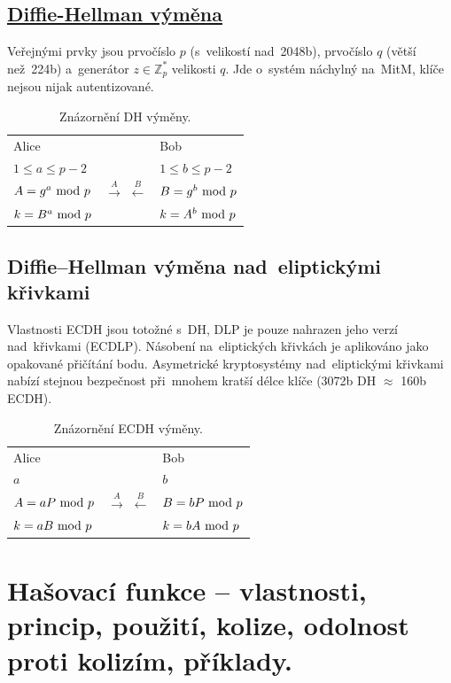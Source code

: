 \subsection[Diffie--Hellman výměna]{\href{https://en.wikipedia.org/wiki/Diffie-Hellman_key_exchange}{Diffie-Hellman výměna}}

Veřejnými prvky jsou prvočíslo $p$ (s~velikostí nad~2048b), prvočíslo $q$ (větší než~224b) a~generátor $z \in \mathbb{Z}_p^*$ velikosti $q$. Jde o~systém náchylný na~MitM, klíče nejsou nijak autentizované.

\begin{table}[ht]
\centering
\begin{tabular}{lcl}
Alice && Bob \\
$1 \le a \le p-2$ && $1 \le b \le p-2$ \\
$A = g^a \ \mathrm{mod}\ p$ & $\stackrel{A}{\rightarrow}$ $\stackrel{B}{\leftarrow}$ & $B = g^b \ \mathrm{mod}\ p$ \\
$k = B^a \ \mathrm{mod}\ p$ && $k = A^b \ \mathrm{mod}\ p$ \\
\end{tabular}
\caption*{Znázornění DH výměny.}
\end{table}

\subsection{Diffie--Hellman výměna nad~eliptickými křivkami}

Vlastnosti ECDH jsou totožné s~DH, DLP je pouze nahrazen jeho verzí nad~křivkami (ECDLP). Násobení na~eliptických křivkách je aplikováno jako opakované přičítání bodu. Asymetrické kryptosystémy nad~eliptickými křivkami nabízí stejnou bezpečnost při~mnohem kratší délce klíče (3072b DH $\approx$ 160b ECDH).

\begin{table}[ht]
\centering
\begin{tabular}{lcl}
Alice && Bob \\
$a$ && $b$ \\
$A = aP \ \mathrm{mod}\ p$ & $\stackrel{A}{\rightarrow}$ $\stackrel{B}{\leftarrow}$ & $B = bP \ \mathrm{mod}\ p$ \\
$k = aB \ \mathrm{mod}\ p$ && $k = bA \ \mathrm{mod}\ p$ \\
\end{tabular}
\caption*{Znázornění ECDH výměny.}
\end{table}

\clearpage
\section{Hašovací funkce -- vlastnosti, princip, použití, kolize, odolnost proti kolizím, příklady.}

